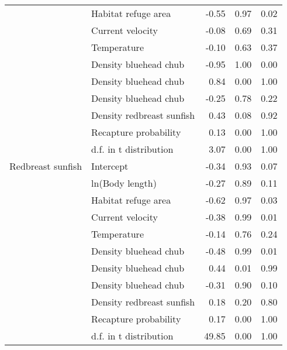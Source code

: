 \begin{table}[ht]
\begin{tabular}{llrrr}
   & Habitat refuge area & -0.55 & 0.97 & 0.02 \\ 
   & Current velocity & -0.08 & 0.69 & 0.31 \\ 
   & Temperature & -0.10 & 0.63 & 0.37 \\ 
   & Density bluehead chub & -0.95 & 1.00 & 0.00 \\ 
   & Density bluehead chub & 0.84 & 0.00 & 1.00 \\ 
   & Density bluehead chub & -0.25 & 0.78 & 0.22 \\ 
   & Density redbreast sunfish & 0.43 & 0.08 & 0.92 \\ 
   & Recapture probability & 0.13 & 0.00 & 1.00 \\ 
   & d.f. in t distribution & 3.07 & 0.00 & 1.00 \\ 
  Redbreast sunfish & Intercept & -0.34 & 0.93 & 0.07 \\ 
   & ln(Body length) & -0.27 & 0.89 & 0.11 \\ 
   & Habitat refuge area & -0.62 & 0.97 & 0.03 \\ 
   & Current velocity & -0.38 & 0.99 & 0.01 \\ 
   & Temperature & -0.14 & 0.76 & 0.24 \\ 
   & Density bluehead chub & -0.48 & 0.99 & 0.01 \\ 
   & Density bluehead chub & 0.44 & 0.01 & 0.99 \\ 
   & Density bluehead chub & -0.31 & 0.90 & 0.10 \\ 
   & Density redbreast sunfish & 0.18 & 0.20 & 0.80 \\ 
   & Recapture probability & 0.17 & 0.00 & 1.00 \\ 
   & d.f. in t distribution & 49.85 & 0.00 & 1.00 \\ 
   \hline
\end{tabular}
\end{table}
